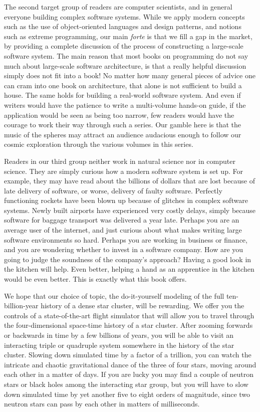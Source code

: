 \documentclass{book}
\begin{document}
The second target group of readers are computer scientists, and in
general everyone building complex software systems.  While we apply
modern concepts such as the use of object-oriented languages and design
patterns, and notions such as extreme programming, our main {\it forte}
is that we fill a gap in the market, by providing a complete discussion
of the process of constructing a large-scale software system.  The main
reason that most books on programming do not say much about large-scale
software architecture, is that a really helpful discussion simply does
not fit into a book!  No matter how many general pieces of advice one
can cram into one book on architecture, that alone is not sufficient
to build a house.  The same holds for building a real-world software
system.  And even if writers would have the patience to write a
multi-volume hands-on guide, if the application would be seen as being
too narrow, few readers would have the courage to work their way
through such a series.  Our gamble here is that the music of the spheres
may attract an audience audacious enough to follow our cosmic exploration
through the various volumes in this series.

Readers in our third group neither work in natural science nor in
computer science.  They are simply curious how a modern software
system is set up.  For example, they may have read about the billions
of dollars that are lost because of late delivery of software, or
worse, delivery of faulty software.  Perfectly functioning rockets
have been blown up because of glitches in complex software systems.
Newly built airports have experienced very costly delays, simply
because software for baggage transport was delivered a year late.
Perhaps you are an average user of the internet, and just curious
about what makes writing large software environments so hard.  Perhaps
you are working in business or finance, and you are wondering whether
to invest in a software company.  How are you going to judge the
soundness of the company's approach?  Having a good look in the
kitchen will help.  Even better, helping a hand as an apprentice in
the kitchen would be even better.  This is exactly what this book offers.

We hope that our choice of topic, the do-it-yourself modeling of the
full ten-billion-year history of a dense star cluster, will be
rewarding.  We offer you the controls of a state-of-the-art flight
simulator that will allow you to travel through the four-dimensional
space-time history of a star cluster.  After zooming forwards or
backwards in time by a few billions of years, you will be able to
visit an interacting triple or quadruple system somewhere in the
history of the star cluster.  Slowing down simulated time by a factor
of a trillion, you can watch the intricate and chaotic gravitational
dance of the three of four stars, moving around each other in a matter
of days.  If you are lucky you may find a couple of neutron stars or
black holes among the interacting star group, but you will have to
slow down simulated time by yet another five to eight orders of
magnitude, since two neutron stars can pass by each other in matters
of milliseconds.
\end{document}
